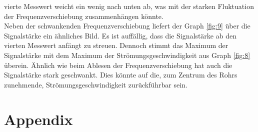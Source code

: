     \justifying vierte Messwert weicht ein wenig nach unten ab, was mit der starken Fluktuation der Frequenzverschiebung zusammenhängen könnte.\\
    Neben der schwankenden Frequenzverschiebung liefert der Graph \ref{fig:9} über die Signalstärke ein ähnliches Bild. Es ist auffällig, dass die Signalstärke ab den vierten
    Messwert anfängt zu streuen. Dennoch stimmt das Maximum der Signalstärke mit dem Maximum der Strömungsgeschwindigkeit aus Graph \ref{fig:8} überein. Ähnlich wie beim Ablesen
    der Frequenzverschiebung hat auch die Signalstärke stark geschwankt. Dies könnte auf die, zum Zentrum des Rohrs zunehmende, Strömungsgeschwindigkeit zurückführbar sein. 

\newpage
\printbibliography

\newpage
\section*{Appendix}

\begin{table}[H]
    \centering
    \caption{In dieser Tabelle sind die Messwerte des Winkels $\theta=15°$ zu finden. Es wurde die Frequenzverschiebung $\Delta\nu$ für verschiedene Stärken der Pumpe gemessen.}
    
    \label{tab:1}
\end{table}

\begin{table}[H]
    \centering
    \caption{In dieser Tabelle sind die Messwerte des Winkels $\theta=30°$ zu finden. Es wurde die Frequenzverschiebung $\Delta\nu$ für verschiedene Stärken der Pumpe gemessen.}
    
    \label{tab:2}
\end{table}

\begin{table}[H]
    \centering
    \caption{In dieser Tabelle sind die Messwerte des Winkels $\theta=45°$ zu finden. Es wurde die Frequenzverschiebung $\Delta\nu$ für verschiedene Stärken der Pumpe gemessen.}
    
    \label{tab:3}
\end{table}

\begin{table}[H]
    \centering
    \caption{In dieser Tabelle sind die Messwerte der Frequenzverschiebung $\Delta\nu$, der jeweiligen Messtiefe $d$ und der Signalstärke zu finden. Diese wurden an dem großen
    Rohr mit einem Durchmesser von \SI{2.015}{\centi\meter} unter Verwendung des Winkels $\theta=15°$ gemessen.}
    
    \label{tab:4}
\end{table}

